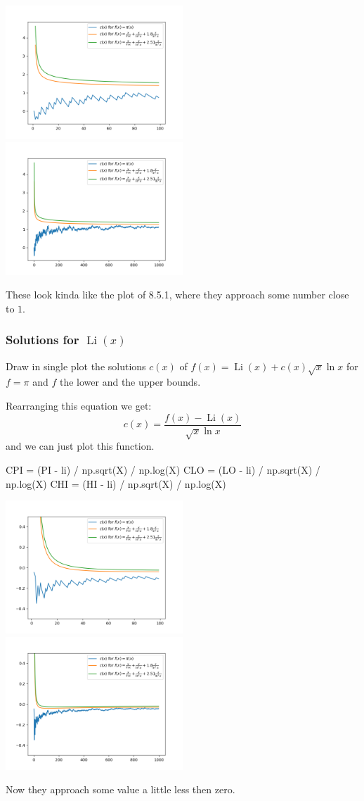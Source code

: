 \documentclass{article}
\newcommand{\Li}{\operatorname{Li}}
\begin{document}
  \noindent
  \includegraphics[width=0.5\textwidth]{dusart_c100}%
  \includegraphics[width=0.5\textwidth]{dusart_c1000}

  These look kinda like the plot of 8.5.1, where they approach some number close to $1$.

  \subsubsection{Solutions for $\Li(x)$}
  \begin{centerframebox}
    Draw in single plot the solutions $c(x)$ of $f(x) = \Li(x) + c(x) \sqrt{x} \ln x$
    for $f = \pi$ and $f$ the lower and the upper bounds.
  \end{centerframebox}
  Rearranging this equation we get:
  \[ c(x) = \frac{f(x) - \Li(x)}{\sqrt{x} \ln x} \]
  and we can just plot this function.
  \begin{mylisting}
    CPI = (PI - li) / np.sqrt(X) / np.log(X)
    CLO = (LO - li) / np.sqrt(X) / np.log(X)
    CHI = (HI - li) / np.sqrt(X) / np.log(X)
  \end{mylisting}

  \noindent
  \includegraphics[width=0.5\textwidth]{dusart_2c100}%
  \includegraphics[width=0.5\textwidth]{dusart_2c1000}

  Now they approach some value a little less then zero.
\end{document}
